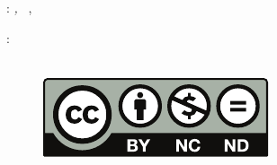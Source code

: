 \thispagestyle{empty}

\hfill

\vfill

\noindent\myName: \textit{\myTitle,} %
\textcopyright\ \myLocation, \myTime

\bigskip

\noindent{}: \\
\myProf \\
\begin{figure}[b]
\includegraphics[]{./gfx/Chapter01/by-nc-nd.pdf}
\end{figure}
%
%
%
%
